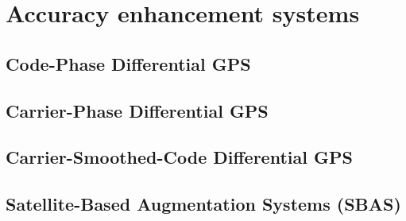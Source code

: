 \chapter{Accuracy enhancement systems}

\section{Code-Phase Differential GPS}

\section{Carrier-Phase Differential GPS}

\section{Carrier-Smoothed-Code Differential GPS}



\section{Satellite-Based Augmentation Systems (SBAS)}